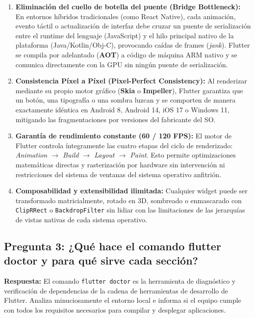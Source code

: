 \documentclass[12pt,a4paper]{article}
\begin{document}
\begin{enumerate}
    \item \textbf{Eliminación del cuello de botella del puente (Bridge Bottleneck):} En entornos híbridos tradicionales (como React Native), cada animación, evento táctil o actualización de interfaz debe cruzar un puente de serialización entre el runtime del lenguaje (JavaScript) y el hilo principal nativo de la plataforma (Java/Kotlin/Obj-C), provocando caídas de frames (\textit{jank}). Flutter se compila por adelantado (\textbf{AOT}) a código de máquina ARM nativo y se comunica directamente con la GPU sin ningún puente de serialización.
    \item \textbf{Consistencia Píxel a Píxel (Pixel-Perfect Consistency):} Al renderizar mediante su propio motor gráfico (\textbf{Skia} o \textbf{Impeller}), Flutter garantiza que un botón, una tipografía o una sombra luzcan y se comporten de manera exactamente idéntica en Android 8, Android 14, iOS 17 o Windows 11, mitigando las fragmentaciones por versiones del fabricante del SO.
    \item \textbf{Garantía de rendimiento constante (60 / 120 FPS):} El motor de Flutter controla íntegramente las cuatro etapas del ciclo de renderizado: \textit{Animation $\rightarrow$ Build $\rightarrow$ Layout $\rightarrow$ Paint}. Esto permite optimizaciones matemáticas directas y rasterización por hardware sin intervención ni restricciones del sistema de ventanas del sistema operativo anfitrión.
    \item \textbf{Composabilidad y extensibilidad ilimitada:} Cualquier widget puede ser transformado matricialmente, rotado en 3D, sombreado o enmascarado con \texttt{ClipRRect} o \texttt{BackdropFilter} sin lidiar con las limitaciones de las jerarquías de vistas nativas de cada sistema operativo.
\end{enumerate}

\subsection{Pregunta 3: ¿Qué hace el comando flutter doctor y para qué sirve cada sección?}
\textbf{Respuesta:}
El comando \texttt{flutter doctor} es la herramienta de diagnóstico y verificación de dependencias de la cadena de herramientas de desarrollo de Flutter. Analiza minuciosamente el entorno local e informa si el equipo cumple con todos los requisitos necesarios para compilar y desplegar aplicaciones.
\end{document}
